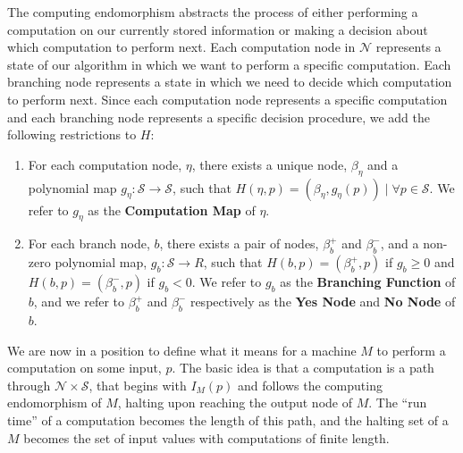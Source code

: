 \documentclass[twoside]{article}
\newcommand{\functype}[3]{$#1:#2 \rightarrow #3$}
\newcommand{\statespace}[0]{\mathcal{S}}
\newcommand{\nodes}[0]{\mathcal{N}}
\begin{document}
The computing endomorphism abstracts the process of either
performing a computation on our currently stored information or
making a decision about which computation to perform next.  Each
computation node in $\nodes$ represents a state of our algorithm in
which we want to perform a specific computation.  Each branching
node represents a state in which we need to decide which computation
to perform next.  Since each computation node represents a specific
computation and each branching node represents a specific decision
procedure, we add the following restrictions to $H$:

\begin{enumerate}
  
\item For each computation node, $\eta$, there exists a unique node,
  $\beta_\eta$ and a polynomial map
  \functype{g_\eta}{\statespace}{\statespace}, such that $H(\eta, p)
  = (\beta_\eta, g_\eta(p)) \mid \forall p \in \statespace$.  We
  refer to $g_\eta$ as the \textbf{Computation Map} of $\eta$.
  
\item For each branch node, $b$, there exists a pair of nodes,
  $\beta_b^+$ and $\beta_b^-$, and a non-zero polynomial map,
  \functype{g_b}{\statespace}{R}, such that $H(b, p) = (\beta_b^+,
  p)$ if $g_b \geq 0$ and $H(b,p) = (\beta_b^-, p)$ if $g_b < 0$.
  We refer to $g_b$ as the \textbf{Branching Function} of $b$, and
  we refer to $\beta_b^+$ and $\beta_b^-$ respectively as the
  \textbf{Yes Node} and \textbf{No Node} of $b$.
  
\end{enumerate}

We are now in a position to define what it means for a machine $M$
to perform a computation on some input, $p$.  The basic idea is that a 
computation is a path through $\nodes \times \statespace$, that begins
with $I_M(p)$ and follows the computing endomorphism of $M$, halting upon
reaching the output node of $M$.  The ``run time'' of a computation becomes
the length of this path, and the halting set of a $M$ becomes the set of input
values with computations of finite length.
\end{document}
